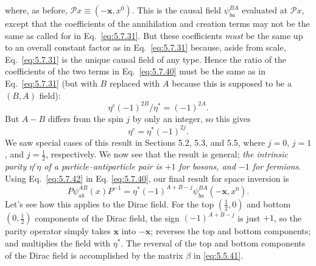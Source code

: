 where, as before, $\mathcal P x\equiv(-\mathbf x,x^0)$. This is the causal
field $\psi^{BA}_{ba}$ evaluated at $\mathcal P x$, except that the coefficients
of the annihilation and creation terms may not be the same as called for in
Eq.~\eqref{eq:5.7.31}. But these coefficients \emph{must} be the same up to an overall
constant factor as in Eq.~\eqref{eq:5.7.31} because, aside from scale, Eq.~\eqref{eq:5.7.31} is
the unique causal field of any type. Hence the ratio of the coefficients of
the two terms in Eq.~\eqref{eq:5.7.40} must be the same as in Eq.~\eqref{eq:5.7.31} (but with
$B$ replaced with $A$ because this is supposed to be a $(B,A)$ field):
\begin{equation}
\eta^c(-1)^{2B}/\eta^*=(-1)^{2A}.
\tag{5.7.41}\label{eq:5.7.41}
\end{equation}
But $A-B$ differs from the spin $j$ by only an integer, so this gives
\begin{equation}
\eta^c=\eta^*(-1)^{2j}.
\tag{5.7.42}\label{eq:5.7.42}
\end{equation}
We saw special cases of this result in Sections 5.2, 5.3, and 5.5, where
$j=0$, $j=1$, and $j=\tfrac12$, respectively. We now see that the result is
general; \emph{the intrinsic parity $\eta^c\eta$ of a particle--antiparticle
pair is $+1$ for bosons, and $-1$ for fermions}. Using Eq.~\eqref{eq:5.7.42} in Eq.
\eqref{eq:5.7.40}, our final result for space inversion is
\begin{equation}
P\psi^{AB}_{ab}(x)P^{-1}=
\eta^*(-1)^{A+B-j}\psi^{BA}_{ba}(-\mathbf x,x^0).
\tag{5.7.43}\label{eq:5.7.43}
\end{equation}
Let's see how this applies to the Dirac field. For the top $(\tfrac12,0)$ and
bottom $(0,\tfrac12)$ components of the Dirac field, the sign
$(-1)^{A+B-j}$ is just $+1$, so the parity operator simply takes $\mathbf x$
into $-\mathbf x$; reverses the top and bottom components; and multiplies the
field with $\eta^*$. The reversal of the top and bottom components of the
Dirac field is accomplished by the matrix $\beta$ in \eqref{eq:5.5.41}.

